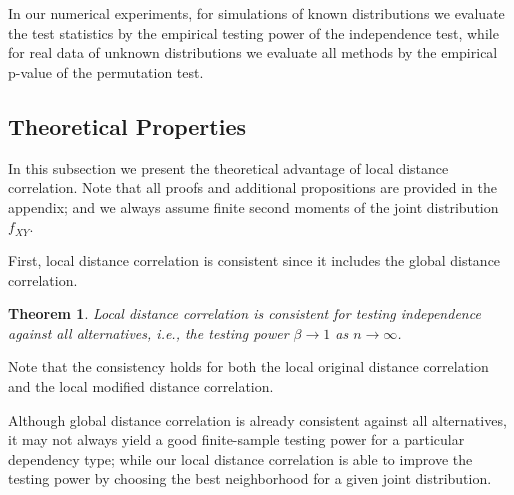 \documentclass[12pt]{article}
\newtheorem{thm}{Theorem}
\begin{document}
In our numerical experiments, for simulations of known distributions we evaluate the test statistics by the empirical testing power of the independence test, while for real data of unknown distributions we evaluate all methods by the empirical p-value of the permutation test. 



\subsection{Theoretical Properties}
\label{main4}
In this subsection we present the theoretical advantage of local distance correlation. Note that all proofs and additional propositions are provided in the appendix; and we always assume finite second moments of the joint distribution $f_{XY}$.

First, local distance correlation is consistent since it includes the global distance correlation.
\begin{thm}
\label{thm1}
Local distance correlation is consistent for testing independence against all alternatives, i.e., the testing power $\beta \rightarrow 1$ as $n \rightarrow \infty$. 
\end{thm}
Note that the consistency holds for both the local original distance correlation and the local modified distance correlation.

Although global distance correlation is already consistent against all alternatives, it may not always yield a good finite-sample testing power for a particular dependency type; while our local distance correlation is able to improve the testing power by choosing the best neighborhood for a given joint distribution. 
\end{document}
